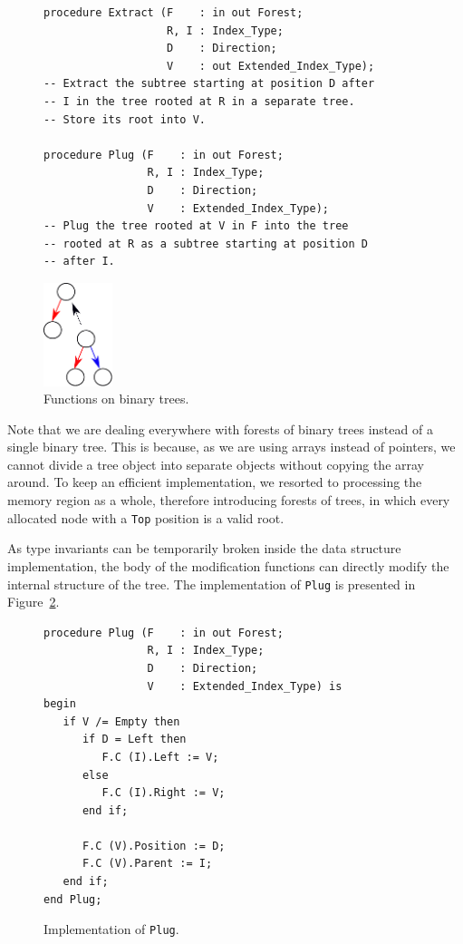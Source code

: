 \documentclass[11pt,a4paper]{article}
\begin{document}
\begin{figure}[ht]
\begin{minipage}[c]{.75\linewidth}
\begin{small}
\begin{lstlisting}
procedure Extract (F    : in out Forest;
                   R, I : Index_Type;
                   D    : Direction;
                   V    : out Extended_Index_Type);
-- Extract the subtree starting at position D after
-- I in the tree rooted at R in a separate tree.
-- Store its root into V.

procedure Plug (F    : in out Forest;
                R, I : Index_Type;
                D    : Direction;
                V    : Extended_Index_Type);
-- Plug the tree rooted at V in F into the tree
-- rooted at R as a subtree starting at position D
-- after I.
\end{lstlisting}
\end{small}
\end{minipage} \hfill
\begin{minipage}[c]{.23\linewidth}
\includegraphics[width=2cm]{plug.pdf}
\end{minipage}
\caption{\label{fig-binary-fun} Functions on binary trees.}
\end{figure}

Note that we are dealing everywhere with forests of binary trees instead of a single
binary tree. This is because, as we are using arrays instead of pointers, we cannot divide a
tree object into separate objects without copying the array around. To keep an efficient
implementation, we resorted to processing the memory region as a whole, therefore
introducing forests of trees, in which every allocated node with a \texttt{Top} position is a
valid root.

As type invariants can be temporarily broken inside the data structure implementation, the body
of the modification functions can directly modify the internal structure of the tree. The implementation
of \texttt{Plug} is presented in Figure~\ref{fig-binary-body}.

\begin{figure}[ht]
\begin{small}
\begin{lstlisting}
procedure Plug (F    : in out Forest;
                R, I : Index_Type;
                D    : Direction;
                V    : Extended_Index_Type) is
begin
   if V /= Empty then
      if D = Left then
         F.C (I).Left := V;
      else
         F.C (I).Right := V;
      end if;

      F.C (V).Position := D;
      F.C (V).Parent := I;
   end if;
end Plug;
\end{lstlisting}
\end{small}
\caption{\label{fig-binary-body} Implementation of \texttt{Plug}.}
\end{figure}
\end{document}
